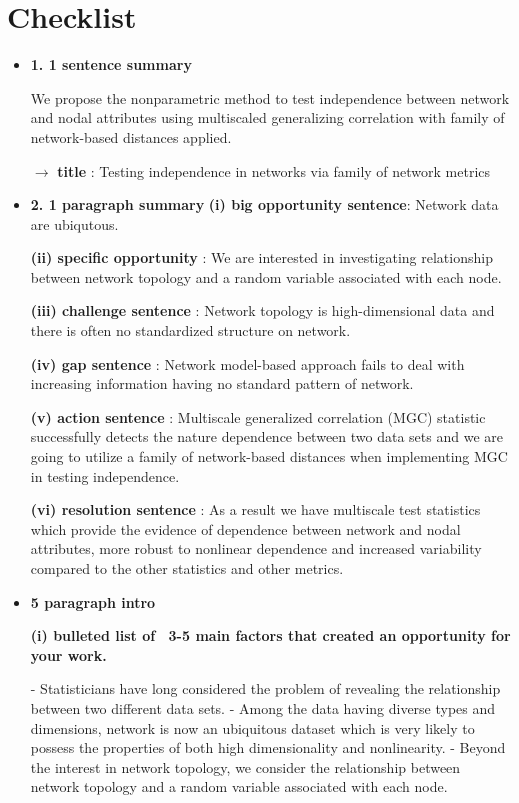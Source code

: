 \documentclass[12pt]{article}
\begin{document}
\newpage
\section{Checklist}

\begin{itemize}

\item \textbf{1.  1 sentence summary}

We propose the nonparametric method to test independence between network and nodal attributes using multiscaled generalizing correlation with family of network-based distances applied.

$\rightarrow$ \textbf{title} : Testing independence in networks via family of network metrics


\item \textbf{2.  1 paragraph summary} 
\subitem \textbf{(i) big opportunity sentence}: Network data are ubiqutous.

\subitem \textbf{(ii) specific opportunity} : We are interested in investigating relationship between network topology and a random variable associated with each node.

\subitem \textbf{(iii) challenge sentence} : Network topology is high-dimensional data and there is often no standardized structure on network.

\subitem \textbf{(iv) gap sentence} : Network model-based approach fails to deal with increasing information having no standard pattern of network.

\subitem \textbf{(v)  action sentence} : Multiscale generalized correlation (MGC) statistic successfully detects the nature dependence between two data sets and we are going to utilize a family of network-based distances when implementing MGC in testing independence.

\subitem \textbf{(vi) resolution sentence} : As a result we have multiscale test statistics which provide the evidence of dependence between network and nodal attributes, more robust to nonlinear dependence and increased variability compared to the other statistics and other metrics.


\item \textbf{5 paragraph intro}

\subitem \textbf{(i) bulleted list of ~3-5 main factors that created an opportunity for your work.}

\subsubitem - Statisticians have long considered the problem of revealing the relationship between two different data sets.
\subsubitem - Among the data having diverse types and dimensions, network is now an ubiquitous dataset which is very likely to possess the properties of both high dimensionality and nonlinearity.
\subsubitem - Beyond the interest in network topology, we consider the relationship between network topology and a random variable associated with each node. 


\end{itemize}
\end{document}

